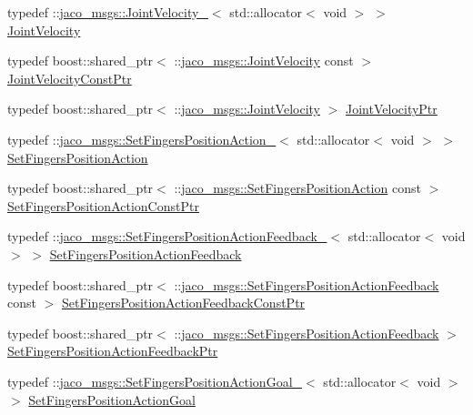 \begin{DoxyCompactItemize}
\item 
typedef \+::\hyperlink{structjaco__msgs_1_1JointVelocity__}{jaco\+\_\+msgs\+::\+Joint\+Velocity\+\_\+}$<$ std\+::allocator$<$ void $>$ $>$ \hyperlink{namespacejaco__msgs_a3885bcb43e15bd44e269141fd88ae604}{Joint\+Velocity}
\item 
typedef boost\+::shared\+\_\+ptr$<$ \+::\hyperlink{namespacejaco__msgs_a3885bcb43e15bd44e269141fd88ae604}{jaco\+\_\+msgs\+::\+Joint\+Velocity} const  $>$ \hyperlink{namespacejaco__msgs_aab606d270e36965850c5e08ce8073242}{Joint\+Velocity\+Const\+Ptr}
\item 
typedef boost\+::shared\+\_\+ptr$<$ \+::\hyperlink{namespacejaco__msgs_a3885bcb43e15bd44e269141fd88ae604}{jaco\+\_\+msgs\+::\+Joint\+Velocity} $>$ \hyperlink{namespacejaco__msgs_a7bf43beaff6bea1d39b3392ed5ce08d6}{Joint\+Velocity\+Ptr}
\item 
typedef \+::\hyperlink{structjaco__msgs_1_1SetFingersPositionAction__}{jaco\+\_\+msgs\+::\+Set\+Fingers\+Position\+Action\+\_\+}$<$ std\+::allocator$<$ void $>$ $>$ \hyperlink{namespacejaco__msgs_a6a86f786fe9f2e29693a22cec953c58c}{Set\+Fingers\+Position\+Action}
\item 
typedef boost\+::shared\+\_\+ptr$<$ \+::\hyperlink{namespacejaco__msgs_a6a86f786fe9f2e29693a22cec953c58c}{jaco\+\_\+msgs\+::\+Set\+Fingers\+Position\+Action} const  $>$ \hyperlink{namespacejaco__msgs_a088ef72877eb1df1d472ecdd4d7fb9e6}{Set\+Fingers\+Position\+Action\+Const\+Ptr}
\item 
typedef \+::\hyperlink{structjaco__msgs_1_1SetFingersPositionActionFeedback__}{jaco\+\_\+msgs\+::\+Set\+Fingers\+Position\+Action\+Feedback\+\_\+}$<$ std\+::allocator$<$ void $>$ $>$ \hyperlink{namespacejaco__msgs_aa4016ccce3bffb26503e5b75be132b70}{Set\+Fingers\+Position\+Action\+Feedback}
\item 
typedef boost\+::shared\+\_\+ptr$<$ \+::\hyperlink{namespacejaco__msgs_aa4016ccce3bffb26503e5b75be132b70}{jaco\+\_\+msgs\+::\+Set\+Fingers\+Position\+Action\+Feedback} const  $>$ \hyperlink{namespacejaco__msgs_ae6320069cd389bae350b577bb3842482}{Set\+Fingers\+Position\+Action\+Feedback\+Const\+Ptr}
\item 
typedef boost\+::shared\+\_\+ptr$<$ \+::\hyperlink{namespacejaco__msgs_aa4016ccce3bffb26503e5b75be132b70}{jaco\+\_\+msgs\+::\+Set\+Fingers\+Position\+Action\+Feedback} $>$ \hyperlink{namespacejaco__msgs_a89d8433678d4b7ef9456c0e4ee4dee12}{Set\+Fingers\+Position\+Action\+Feedback\+Ptr}
\item 
typedef \+::\hyperlink{structjaco__msgs_1_1SetFingersPositionActionGoal__}{jaco\+\_\+msgs\+::\+Set\+Fingers\+Position\+Action\+Goal\+\_\+}$<$ std\+::allocator$<$ void $>$ $>$ \hyperlink{namespacejaco__msgs_afb0458ba4bb87a09d2bb557f1e4351a4}{Set\+Fingers\+Position\+Action\+Goal}

\end{DoxyCompactItemize}
